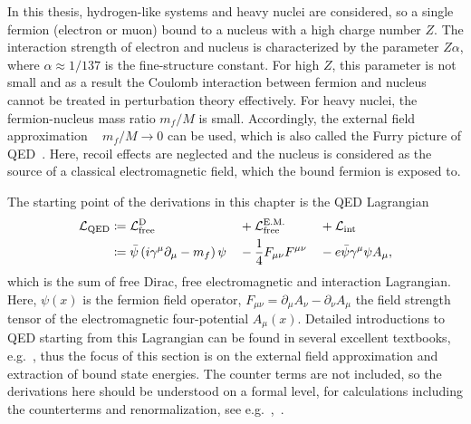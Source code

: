 In this thesis, hydrogen-like systems and heavy nuclei are considered, so a single fermion (electron or muon) bound to a nucleus with a high charge number $Z$. The interaction strength of electron and nucleus is characterized by the parameter $Z\alpha$, where $\alpha \approx 1/137$ is the fine-structure constant. For high $Z$, this parameter is not small and as a result the Coulomb interaction between fermion and nucleus cannot be treated in perturbation theory effectively. 
For heavy nuclei, the fermion-nucleus mass ratio $m_f/M$ is small. Accordingly, the external field approximation ~\cite[\mbox{Section~13.6}]{weinberg2005} $m_f/M \rightarrow 0$ can be used, which is also called the Furry picture of QED~\cite{furry1951}. Here, recoil effects are neglected and the nucleus is considered as the source of a classical electromagnetic field, which the bound fermion is exposed to.

The starting point of the derivations in this chapter is the QED Lagrangian 
\begin{alignat}{6}
\label{eq:Lqed}
\mathcal{L}_{\text{QED}}
&\coloneqq \mathcal{L}_{\text{free}}^{\text{D}} &&+ \mathcal{L}_{\text{free}}^{\text{E.M.}} &&+ \mathcal{L}_{\text{int}} \\
&\coloneqq\bar{\psi}\left( i \gamma^\mu \partial_\mu -m_f \right)\psi &&-\frac{1}{4}F_{\mu\nu}F^{\mu\nu}&&-e\bar{\psi}\gamma^\mu \psi A_\mu,\notag
\end{alignat}
which is the sum of free Dirac, free electromagnetic and interaction Lagrangian. Here, $\psi(x)$ is the fermion field operator, $F_{\mu\nu}=\partial_\mu A_\nu - \partial_\nu A_\mu$ the field strength tensor of the electromagnetic four-potential $A_\mu(x)$. Detailed introductions to QED starting from this Lagrangian can be found in several excellent textbooks, e.g.~\cite{weinberg2005,itzykson2005,peskin1995}, thus the focus of this section is on the external field approximation and extraction of bound state energies. The counter terms are not included, so the derivations here should be understood on a formal level, for calculations including the counterterms and renormalization, see \mbox{e.g.~\cite[Section 14]{weinberg2005},~\cite{shabaev2002_2}.}

